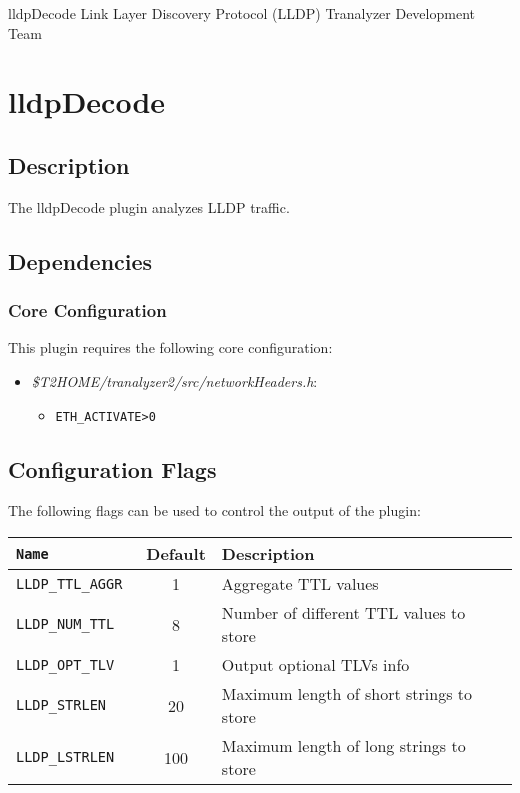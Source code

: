 \documentclass[documentation]{subfiles}
\begin{document}
\trantitle
    {lldpDecode} %
    {Link Layer Discovery Protocol (LLDP)} %
    {Tranalyzer Development Team} %

\section{lldpDecode}\label{s:lldpDecode}

\subsection{Description}
The lldpDecode plugin analyzes LLDP traffic.

\subsection{Dependencies}

\subsubsection{Core Configuration}
This plugin requires the following core configuration:
\begin{itemize}
    \item {\em \$T2HOME/tranalyzer2/src/networkHeaders.h}:
        \begin{itemize}
            \item {\tt ETH\_ACTIVATE>0}
        \end{itemize}
\end{itemize}

\subsection{Configuration Flags}
The following flags can be used to control the output of the plugin:
\begin{longtable}{>{\tt}lcl}
    \toprule
    {\bf Name} & {\bf Default} & {\bf Description}\\
    \midrule\endhead%
    LLDP\_TTL\_AGGR &   1 & Aggregate TTL values\\
    LLDP\_NUM\_TTL  &   8 & Number of different TTL values to store\\
    LLDP\_OPT\_TLV  &   1 & Output optional TLVs info\\
    LLDP\_STRLEN    &  20 & Maximum length of short strings to store\\
    LLDP\_LSTRLEN   & 100 & Maximum length of long strings to store\\
    \bottomrule
\end{longtable}
\end{document}
